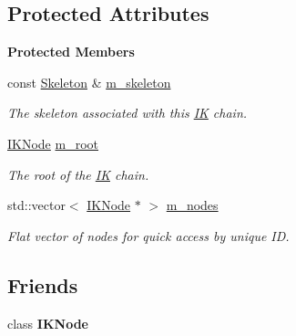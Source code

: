 \subsection*{Protected Attributes}
\begin{Indent}\textbf{ Protected Members}\par
\begin{DoxyCompactItemize}
\item 
\mbox{\label{classrev_1_1_i_k_chain_a5a33e5d0c62395ce9d766e3ddef666e3}} 
const \mbox{\hyperlink{classrev_1_1_skeleton}{Skeleton}} \& \mbox{\hyperlink{classrev_1_1_i_k_chain_a5a33e5d0c62395ce9d766e3ddef666e3}{m\+\_\+skeleton}}
\begin{DoxyCompactList}\small\item\em The skeleton associated with this \mbox{\hyperlink{classrev_1_1_i_k}{IK}} chain. \end{DoxyCompactList}\item 
\mbox{\label{classrev_1_1_i_k_chain_ae725da930ef29c3a5deed34cd80dd933}} 
\mbox{\hyperlink{classrev_1_1_i_k_node}{I\+K\+Node}} \mbox{\hyperlink{classrev_1_1_i_k_chain_ae725da930ef29c3a5deed34cd80dd933}{m\+\_\+root}}
\begin{DoxyCompactList}\small\item\em The root of the \mbox{\hyperlink{classrev_1_1_i_k}{IK}} chain. \end{DoxyCompactList}\item 
\mbox{\label{classrev_1_1_i_k_chain_a7e13ab4d8aaedc241ba739a55255a2ba}} 
std\+::vector$<$ \mbox{\hyperlink{classrev_1_1_i_k_node}{I\+K\+Node}} $\ast$ $>$ \mbox{\hyperlink{classrev_1_1_i_k_chain_a7e13ab4d8aaedc241ba739a55255a2ba}{m\+\_\+nodes}}
\begin{DoxyCompactList}\small\item\em Flat vector of nodes for quick access by unique ID. \end{DoxyCompactList}\end{DoxyCompactItemize}
\end{Indent}
\subsection*{Friends}
\begin{DoxyCompactItemize}
\item 
\mbox{\label{classrev_1_1_i_k_chain_ae5889d88e5cbb223df47f108754dc548}} 
class {\bfseries I\+K\+Node}
\end{DoxyCompactItemize}



